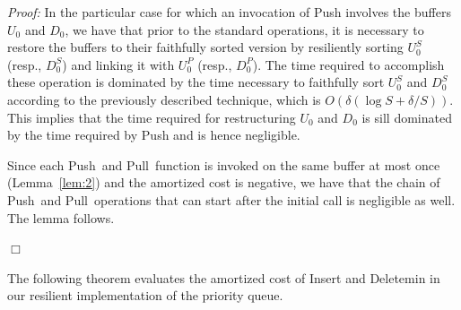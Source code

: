 \documentclass[review,number]{elsarticle}
\newcommand{\BO}[1]{{O}\left(#1\right)}
\renewenvironment{proof}{\begin{trivlist}
                         \item[] {\em Proof:}}{\hfill $\Box$
                       \end{trivlist}}
\newcommand{\Insert}{\textsf{Insert}}
\newcommand{\Deletemin}{\textsf{Deletemin}}
\newcommand{\Push}{\textsf{Push}}
\newcommand{\Pull}{\textsf{Pull}}
\begin{document}
\begin{proof}
In the particular case for which an
invocation of \Push{} involves the buffers $U_0$ and $D_0$, we have that prior
to the standard operations, it is necessary to restore the buffers to
their faithfully sorted version by resiliently sorting $U^S_0$ (resp.,
$D^S_0$) and linking it with $U^P_0$ (resp., $D^P_0$). The time required
to accomplish these operation is dominated by the time necessary to faithfully
sort $U^S_0$ and $D^S_0$ according to the previously described technique, which
is $\BO{\delta\left(\log S + \delta/S\right)}$. This implies that the time
required
for restructuring $U_0$ and $D_0$ is sill dominated by the time required
by \Push{} and is hence negligible.

Since each \Push\ and \Pull\ function is invoked on the
same buffer at most once (Lemma~\ref{lem:2}) and the amortized cost is
negative, we have that the chain of \Push\ and \Pull\ operations that can
start after the initial call is  negligible as well.  The lemma follows.

\end{proof}

The following theorem evaluates the amortized cost of \Insert{} and
\Deletemin{} in our resilient implementation of the priority queue. 
\end{document}
